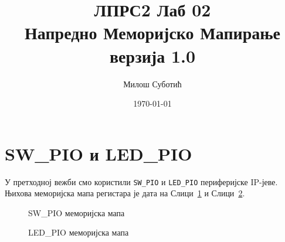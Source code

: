 \documentclass[12pt]{article}
\title{
	ЛПРС2 Лаб 02\\
	{\normalsize Напредно Меморијско Мапирање}\\
	{\small верзија 1.0}
}
\author{Милош Суботић}
\date{\today}
\def\regWD{-4mm}
\def\regHO{-30mm}
\def\regH{-13mm}
\def\regRWO{\regH-0mm}
\def\regIVO{\regRWO-5mm}
\newcommand{\regBitLegend}[1]{%
	\node[anchor=south east] at (32*\regWD, #1*\regHO) {Bits};
}
\newcommand{\regBit}[2]{%
	\node[anchor=south] at (#2*\regWD+0.5*\regWD, #1*\regHO) {#2};
}
\newcommand{\regAddr}[2]{%
	\node[anchor=east] at (32*\regWD, #1*\regHO+0.5*\regH) {#2};
}
\newcommand{\regField}[4]{%
	\draw (#2*\regWD+\regWD, #1*\regHO) rectangle (#3*\regWD, #1*\regHO+\regH)
		node[pos=.5] {\texttt{#4}};
}
\newcommand{\regRWLegend}[1]{%
	\node[anchor=north east] at (32*\regWD, #1*\regHO+\regRWO) {Read/Write};
}
\newcommand{\regRW}[4]{%
	\node[anchor=north] at 
		(
			#2*0.5*\regWD + #3*0.5*\regWD + 0.5*\regWD,
			#1*\regHO+\regRWO
		)
		{#4};
}
\newcommand{\regInitLegend}[1]{%
	\node[anchor=north east] at (32*\regWD, #1*\regHO+\regIVO) {Inital Value};
}
\newcommand{\regInit}[4]{%
	\node[anchor=north] at 
		(
			#2*0.5*\regWD + #3*0.5*\regWD + 0.5*\regWD,
			#1*\regHO+\regIVO
		)
		{#4};
}
\newcommand{\regStd}[2]{%
	\regBitLegend{#1}
	\regAddr{#1}{#2}
	\regRWLegend{#1}
	\regInitLegend{#1}
	\regBit{#1}{31}
	\regBit{#1}{0}
}
\begin{document}
\sloppy %



\clearpage
\maketitle
\thispagestyle{empty}


\section{SW\_PIO и LED\_PIO}
\par
У претходној вежби смо користили \verb|SW_PIO| и \verb|LED_PIO|
периферијске IP-јеве.
Њихова меморијска мапа регистара је дата на
Слици~\ref{fig:sw_pio_mm} и Слици~\ref{fig:led_pio_mm}.

\begin{figure}[H]
	\centering
	
	\caption{\textsc{SW\_PIO} меморијска мапа}
	\label{fig:sw_pio_mm}
\end{figure}

\begin{figure}[H]
	\centering
	
	\caption{\textsc{LED\_PIO} меморијска мапа}
	\label{fig:led_pio_mm}
\end{figure}
\end{document}
